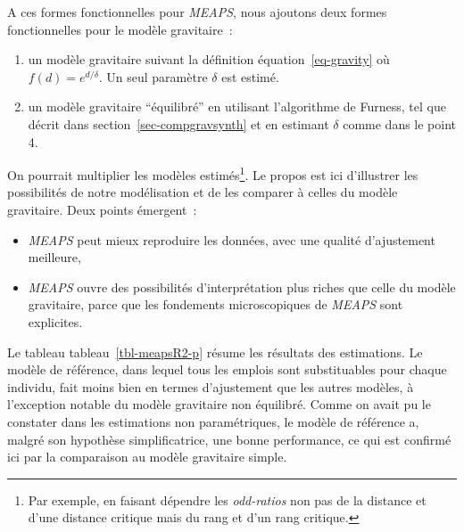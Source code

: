 \documentclass[
  10pt,
  a4paper,
  numbers=noendperiod,
  DIV=9]{scrartcl}
\providecommand{\tightlist}{%
  \setlength{\itemsep}{0pt}\setlength{\parskip}{0pt}}\usepackage{longtable,booktabs,array}
\begin{document}
A ces formes fonctionnelles pour \emph{MEAPS}, nous ajoutons deux formes
fonctionnelles pour le modèle gravitaire~:

\begin{enumerate}
\def\labelenumi{\arabic{enumi}.}
\setcounter{enumi}{3}
\tightlist
\item
  un modèle gravitaire suivant la définition équation~\ref{eq-gravity}
  où \(f(d)= e^{d/\delta}\). Un seul paramètre \(\delta\) est estimé.
\item
  un modèle gravitaire ``équilibré'' en utilisant l'algorithme de
  Furness, tel que décrit dans section~\ref{sec-compgravsynth} et en
  estimant \(\delta\) comme dans le point 4.
\end{enumerate}

On pourrait multiplier les modèles estimés\footnote{Par exemple, en
  faisant dépendre les \emph{odd-ratios} non pas de la distance et d'une
  distance critique mais du rang et d'un rang critique.}. Le propos est
ici d'illustrer les possibilités de notre modélisation et de les
comparer à celles du modèle gravitaire. Deux points émergent~:

\begin{itemize}
\item
  \emph{MEAPS} peut mieux reproduire les données, avec une qualité
  d'ajustement meilleure,
\item
  \emph{MEAPS} ouvre des possibilités d'interprétation plus riches que
  celle du modèle gravitaire, parce que les fondements microscopiques de
  \emph{MEAPS} sont explicites.
\end{itemize}

Le tableau tableau~\ref{tbl-meapsR2-p} résume les résultats des
estimations. Le modèle de référence, dans lequel tous les emplois sont
substituables pour chaque individu, fait moins bien en termes
d'ajustement que les autres modèles, à l'exception notable du modèle
gravitaire non équilibré. Comme on avait pu le constater dans les
estimations non paramétriques, le modèle de référence a, malgré son
hypothèse simplificatrice, une bonne performance, ce qui est confirmé
ici par la comparaison au modèle gravitaire simple.
\end{document}

